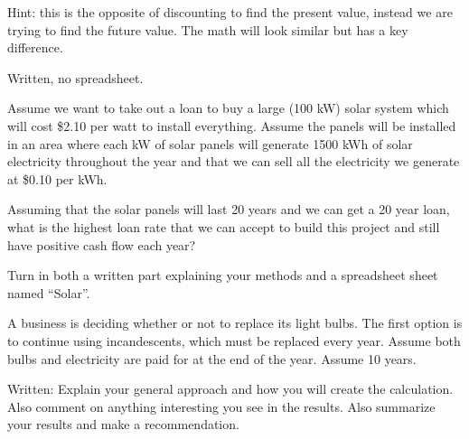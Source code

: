 \documentclass{article}
\begin{document}
Hint: this is the opposite of discounting to find the present value,
instead we are trying to find the future value.  The math will look
similar but has a key difference.

Written, no spreadsheet.



Assume we want to take out a loan to buy a large (100 kW) solar system
which will cost \$2.10 per watt to install everything.  Assume the
panels will be installed in an area where each kW of solar panels will
generate 1500 kWh of solar electricity throughout the year and that we
can sell all the electricity we generate at \$0.10 per kWh.

Assuming that the solar panels will last 20 years and we can get a 20
year loan, what is the highest loan rate that we can accept to build
this project and still have positive cash flow each year?

Turn in both a written part explaining your methods and a spreadsheet
sheet named ``Solar''.




A business is deciding whether or not to replace its light bulbs.  The
first option is to continue using incandescents, which must be replaced
every year.  Assume both bulbs and electricity are paid for at the
end of the year.  Assume 10 years.

Written: Explain your general approach and how you will create the
calculation.  Also comment on anything interesting you see in the
results.  Also summarize your results and make a recommendation.
\end{document}
